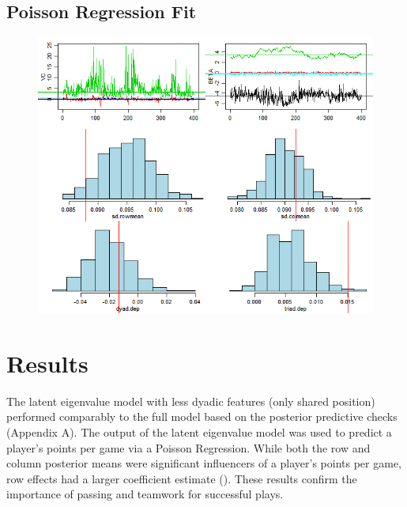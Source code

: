 \documentclass[12pt,twoside]{dukestatscithesis}
\theoremstyle{definition}
\theoremstyle{definition}
\theoremstyle{definition}
\theoremstyle{remark}
\begin{document}
\subsection{Poisson Regression Fit}\label{poisson-regression-fit}
\begin{figure}
\centering
\includegraphics{img/amenoutputloss.png}
\caption{}
\end{figure}
\section{Results}\label{results}

The latent eigenvalue model with less dyadic features (only shared
position) performed comparably to the full model based on the posterior
predictive checks (Appendix A). The output of the latent eigenvalue
model was used to predict a player's points per game via a Poisson
Regression. While both the row and column posterior means were
significant influencers of a player's points per game, row effects had a
larger coefficient estimate (). These results confirm the importance of
passing and teamwork for successful plays.
\end{document}
